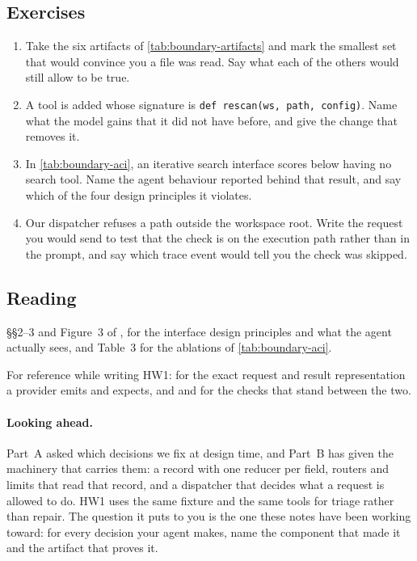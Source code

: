 \subsection{Exercises}

\begin{enumerate}
\item Take the six artifacts of \cref{tab:boundary-artifacts} and mark the smallest set that would
  convince you a file was read. Say what each of the others would still allow to be true.
\item A tool is added whose signature is \verb|def rescan(ws, path, config)|. Name what the model
  gains that it did not have before, and give the change that removes it.
\item In \cref{tab:boundary-aci}, an iterative search interface scores below having no search tool.
  Name the agent behaviour reported behind that result, and say which of the four design principles
  it violates.
\item Our dispatcher refuses a path outside the workspace root. Write the request you would send to
  test that the check is on the execution path rather than in the prompt, and say which trace event
  would tell you the check was skipped.
\end{enumerate}

\subsection{Reading}

\S\S2--3 and Figure~3 of \citet{yang2024sweagent}, for the interface design principles
and what the agent actually sees, and Table~3 for the ablations of \cref{tab:boundary-aci}.

For reference while writing HW1: \citet{anthropic-tooluse} for the exact request and result
representation a provider emits and expects, and  and 
for the checks that stand between the two.

\paragraph{Looking ahead.} Part~A asked which decisions we fix at design time, and Part~B has given
the machinery that carries them: a record with one reducer per field, routers and limits that read
that record, and a dispatcher that decides what a request is allowed to do. HW1 uses the same
fixture and the same tools for triage rather than repair. The question it puts to you is the one
these notes have been working toward: for every decision your agent makes, name the component that
made it and the artifact that proves it.
